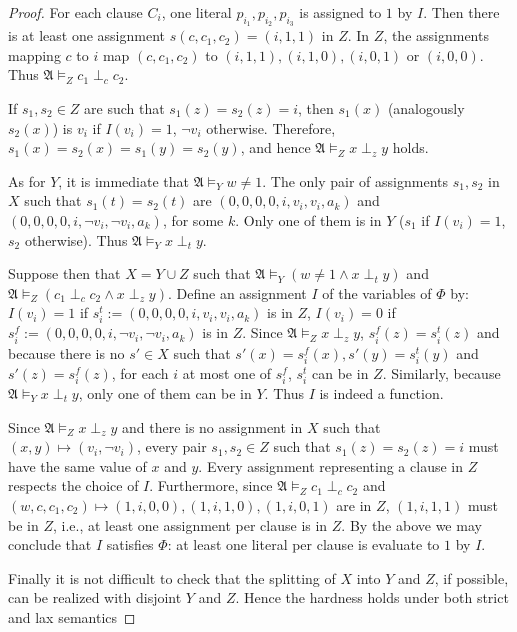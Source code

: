 \documentclass{article}
\theoremstyle{plain}
\theoremstyle{definition}
\newcommand{\mA}{{\mathfrak A}}
\begin{document}
\begin{proof}
	For each clause $C_i$, one literal $p_{i_1},p_{i_2},p_{i_3}$ is assigned to $1$ by $I$. Then there is at least one assignment $s(c,c_1,c_2) = (i,1,1)$ in $Z$. In $Z$, the  assignments mapping $c$ to $i$ map $(c,c_1,c_2)$ to $(i,1,1), (i,1,0),(i,0,1)$ or $(i,0,0)$. Thus $\mA \models_Z c_1\perp_c c_2$. 
	
	If $s_1,s_2 \in Z$  are such that $s_1(z)=s_2(z) = i$, then $s_1(x)$ (analogously $s_2(x)$) is $v_{i}$ if $I(v_i) = 1$, $\neg v_i$ otherwise.  Therefore, $s_1(x) = s_2(x) = s_1(y) = s_2(y)$, and hence $\mA \models_Z x \perp_z y$  holds.
	
	As for $Y$, it is immediate that $\mA \models_Y w\neq 1$. The only pair of assignments $s_1,s_2$ in $X$ such that $s_1(t)=s_2(t)$ are $(0,0,0,0,i,v_i,v_i,a_k)$ and $(0,0,0,0,i,\neg v_i,\neg v_i,a_k)$, for some $k$. Only one of them is in $Y$ ($s_1$ if $I(v_i) = 1$, $s_2$ otherwise). Thus $\mA \models_Y x \perp_t y$.
	


Suppose then that $X = Y \cup Z$ such that $\mA \models_Y \left(w\neq 1 \wedge x \perp_{t} y \right)$ and $\mA \models_Z \left(c_1\perp_c c_2 \wedge x \perp_z y\right)$. Define an assignment  $I$ of the variables of $\Phi$ by: $I(v_i) = 1$ if $s_i^t:=(0,0,0,0,i,v_i,v_i,a_k)$ is in $Z$, $I(v_i) = 0$ if $s_i^f:=(0,0,0,0,i,\neg v_i,\neg v_i,a_k)$ is in $Z$. Since $\mA \models_Z x \perp_z y$, $s_i^f(z) = s_i^t(z)$ and because there is no $s' \in X$ such that $s'(x) = s_i^f(x), s'(y) = s_i^t(y)$ and $s'(z) = s_i^f(z)$, for each $i$ at most one of $s_i^f$, $s_i^t$ can be in $Z$. Similarly, because $\mA \models_Y x \perp_t y$, only one of them can be in $Y$. Thus $I$ is indeed a function.

Since $\mA \models_Z x\perp_z y$ and there is no assignment in $X$ such that $(x,y)\mapsto(v_i,\neg v_i)$, every pair $s_1,s_2 \in Z$ such that $s_1(z) = s_2(z) =i$ must have the same value of $x$ and $y$. Every assignment representing a clause in $Z$ respects the choice of $I$. Furthermore, since $\mA \models_Z c_1 \perp_c c_2$ and $(w,c,c_1,c_2) \mapsto (1,i,0,0), (1,i,1,0),(1,i,0,1)$ are in $Z$, $(1,i,1,1)$ must be in $Z$, i.e., at least one assignment per clause is in $Z$. By the above we may conclude that $I$ satisfies $\Phi$: at least one literal per clause is evaluate to $1$ by $I$.


Finally it is not difficult to check that  the splitting of $X$ into $Y$ and $Z$, if possible, can be  realized with disjoint $Y$ and $Z$. Hence the hardness holds  under both strict and lax semantics 

\end{proof}
\end{document}
